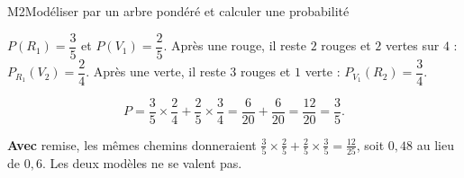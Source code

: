 \begin{fichemethode}{M2}{Modéliser par un arbre pondéré et calculer une probabilité}
{  %
  $P(R_1)=\dfrac{3}{5}$ et $P(V_1)=\dfrac{2}{5}$. Après une rouge, il reste
  $2$ rouges et $2$ vertes sur $4$ : $P_{R_1}(V_2)=\dfrac{2}{4}$. Après une
  verte, il reste $3$ rouges et $1$ verte : $P_{V_1}(R_2)=\dfrac{3}{4}$.

  \[
    P = \frac{3}{5}\times\frac{2}{4} + \frac{2}{5}\times\frac{3}{4}
      = \frac{6}{20}+\frac{6}{20} = \frac{12}{20} = \frac{3}{5}.
  \]

  \medskip
  \textbf{Avec} remise, les mêmes chemins donneraient
  $\frac{3}{5}\times\frac{2}{5}+\frac{2}{5}\times\frac{3}{5}=\frac{12}{25}$,
  soit $0{,}48$ au lieu de $0{,}6$. Les deux modèles ne se valent pas.
}


\end{fichemethode}
